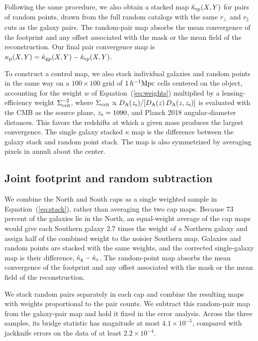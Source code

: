 \documentclass[preprint]{aastex701}
\newcommand{\hinvMpc}{h^{-1}{\rm Mpc}}
\begin{document}
Following the same procedure, we also obtain a stacked map $\hat\kappa_{\rm rp}(X,Y)$ for pairs of random points, drawn from the full random catalogs with the same $r_{\perp}$ and $r_{\parallel}$ cuts as the galaxy pairs. The
random-pair map absorbs the mean convergence of the footprint and any offset associated with the mask or the mean field of the reconstruction. Our final pair convergence map is $\kappa_{\rm p}(X,Y) = \hat\kappa_{\rm gp}(X,Y) -\hat\kappa_{\rm rp}(X,Y)$.

To construct a control map, we also stack individual galaxies and random
points in the same way on a $100\times100$ grid of $1\,\hinvMpc$ cells
centered on the object, accounting for the weight $w$ of
Equation~(\ref{eq:weights}) multiplied by a lensing-efficiency weight
$\Sigma_{\rm crit}^{-2}$, where
$\Sigma_{\rm crit}\propto D_{\rm A}(z_{\rm s})/[D_{\rm A}(z)\,D_{\rm A}(z,z_{\rm s})]$
is evaluated with the CMB as the source plane, $z_{\rm s}=1090$, and
Planck 2018 angular-diameter distances. This favors the redshifts at which a
given mass produces the largest convergence. The single galaxy stacked
$\kappa$ map is the difference between the galaxy stack and random point
stack. The map is also symmetrized by averaging pixels in annuli about the
center.


 {

\subsection{Joint footprint and random subtraction}
\label{sec:joint}

We combine the North and South caps as a single weighted sample in
Equation~(\ref{eq:stack}), rather than averaging the two cap maps. Because
$73$ percent of the galaxies lie in the North, an equal-weight average of the
cap maps would give each Southern galaxy $2.7$ times the weight of a Northern
galaxy and assign half of the combined weight to the noisier Southern map.
Galaxies and random points are stacked with the same weights, and the
corrected single-galaxy map is their difference,
$\hat\kappa_{\rm g}-\hat\kappa_{\rm r}$. The random-point map absorbs the
mean convergence of the footprint and any offset associated with the mask
or the mean field of the reconstruction.

We stack random pairs separately in each cap and combine the resulting maps
with weights proportional to the pair counts. We subtract this random-pair
map from the galaxy-pair map and hold it fixed in the error analysis. Across
the three samples, its bridge statistic has magnitude at most
$4.1\times10^{-5}$, compared with jackknife errors on the data of at least
$2.2\times10^{-4}$.
} \fi
\end{document}
